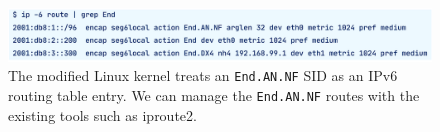\begin{figure}[t]
  \centering
  \includegraphics[width=0.95\linewidth]{img/End-FW-show-route.pdf}
  \caption{The modified Linux kernel treats an \texttt{End.AN.NF} SID as an IPv6 routing table entry. We can manage the \texttt{End.AN.NF} routes with the existing tools such as iproute2.}
  \label{fig:show-route}
\end{figure}